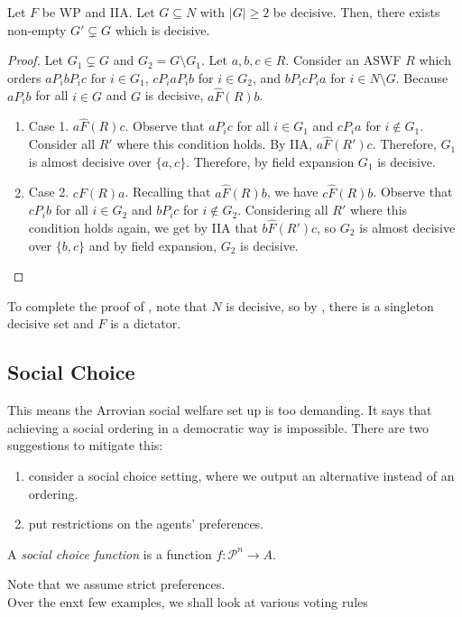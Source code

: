 	\begin{lemma}
		\label{lem: arrow group contraction}
		Let $F$ be WP and IIA. Let $G \subseteq N$ with $|G| \ge 2$ be decisive. Then, there exists non-empty $G' \subsetneq G$ which is decisive.
	\end{lemma}
	\begin{proof}
		Let $G_1 \subsetneq G$ and $G_2 = G \setminus G_1$. Let $a,b,c \in R$. Consider an ASWF $R$ which orders $a P_i b P_i c$ for $i \in G_1$, $c P_i a P_i b$ for $i \in G_2$, and $b P_i c P_i a$ for $i \in N \setminus G$. Because $a P_i b$ for all $i \in G$ and $G$ is decisive, $a \hat{F}(R) b$.
		\begin{enumerate}
			\item Case 1. $a \hat{F}(R) c$. Observe that $a P_i c$ for all $i \in G_1$ and $c P_i a$ for $i \not\in G_1$. Consider all $R'$ where this condition holds. By IIA, $a \hat{F}(R') c$. Therefore, $G_1$ is almost decisive over $\{a,c\}$. Therefore, by field expansion $G_1$ is decisive.
			\item Case 2. $c F(R) a$. Recalling that $a \hat{F}(R) b$, we have $c \hat{F}(R) b$. Observe that $c P_i b$ for all $i \in G_2$ and $b P_i c$ for $i \not\in G_2$. Considering all $R'$ where this condition holds again, we get by IIA that $b \hat{F}(R') c$, so $G_2$ is almost decisive over $\{b,c\}$ and by field expansion, $G_2$ is decisive.
		\end{enumerate}
	\end{proof}

	To complete the proof of , note that $N$ is decisive, so by , there is a singleton decisive set and $F$ is a dictator.

\subsection{Social Choice}

	This means the Arrovian social welfare set up is too demanding. It says that achieving a social ordering in a democratic way is impossible. There are two suggestions to mitigate this:
	\begin{enumerate}
		\item consider a social choice setting, where we output an alternative instead of an ordering.
		\item put restrictions on the agents' preferences.
	\end{enumerate}

	\begin{fdef}
		A \emph{social choice function} is a function $f : \mathcal{P}^n \to A$.
	\end{fdef}
	Note that we assume strict preferences.\\
	Over the enxt few examples, we shall look at various voting rules

